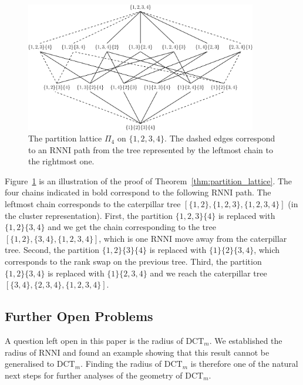 \documentclass[11pt]{amsart}
\newcommand{\rnni}{\mathrm{RNNI}}
\newcommand{\dtt}{\mathrm{DCT}}
\newcommand{\summary}[1]{} %
\begin{document}
\begin{figure}[H]
\centering
\includegraphics[width=0.9\textwidth]{partition_lattice4}
\vspace{12pt}
\caption{The partition lattice $\Pi_4$ on $\{1,2,3,4\}$.
The dashed edges correspond to an $\rnni$ path from the tree represented by the leftmost chain to the rightmost one.}
\label{fig:partition_lattice4}
\end{figure}

Figure~\ref{fig:partition_lattice4} is an illustration of the proof of Theorem~\ref{thm:partition_lattice}.
The four chains indicated in bold correspond to the following $\rnni$ path.
The leftmost chain corresponds to the caterpillar tree $[\{1, 2\}, \{1, 2, 3\}, \{1, 2, 3, 4\}]$ (in the cluster representation).
First, the partition $\{1, 2, 3\} \{4\}$ is replaced with $\{1, 2\} \{3, 4\}$ and we get the chain corresponding to the tree $[\{1, 2\}, \{3, 4\}, \{1, 2, 3, 4\}]$, which is one $\rnni$ move away from the caterpillar tree.
Second, the partition $\{1, 2\} \{3\} \{4\}$ is replaced with $\{1\} \{2\} \{3, 4\}$, which corresponds to the rank swap on the previous tree.
Third, the partition $\{1, 2\} \{3, 4\}$ is replaced with $\{1\} \{2, 3, 4\}$ and we reach the caterpillar tree $[\{3,4\}, \{2, 3, 4\}, \{1, 2, 3, 4\}]$.

\subsection{Further Open Problems}

\summary{Radius $\dtt_m$}
A question left open in this paper is the radius of $\dtt_m$.
We established the radius of $\rnni$ and found an example showing that this result cannot be generalised to $\dtt_m$.
Finding the radius of $\dtt_m$ is therefore one of the natural next steps for further analyses of the geometry of $\dtt_m$.
\end{document}
